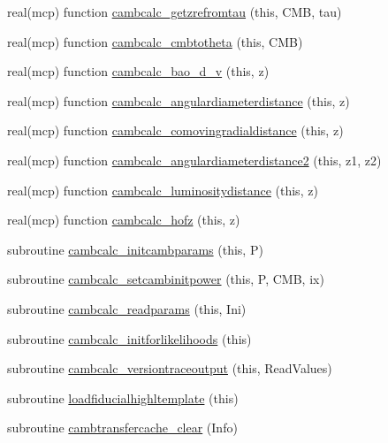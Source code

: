 \begin{DoxyCompactItemize}
real(mcp) function \mbox{\hyperlink{namespacecalculator__camb_a36d033f09a4d35c8b9a37d518fcebda0}{cambcalc\+\_\+getzrefromtau}} (this, C\+MB, tau)
\item 
real(mcp) function \mbox{\hyperlink{namespacecalculator__camb_a88bb5f71c4e4784315929d98702a1214}{cambcalc\+\_\+cmbtotheta}} (this, C\+MB)
\item 
real(mcp) function \mbox{\hyperlink{namespacecalculator__camb_a18709a68a49a6989073dae760f643430}{cambcalc\+\_\+bao\+\_\+d\+\_\+v}} (this, z)
\item 
real(mcp) function \mbox{\hyperlink{namespacecalculator__camb_a40bf5a8b3435b93efcaa688ecb4867f4}{cambcalc\+\_\+angulardiameterdistance}} (this, z)
\item 
real(mcp) function \mbox{\hyperlink{namespacecalculator__camb_a44d780a147bc9cea89b7ebe9a071b98a}{cambcalc\+\_\+comovingradialdistance}} (this, z)
\item 
real(mcp) function \mbox{\hyperlink{namespacecalculator__camb_a368f4f92f978124067f561deb5392714}{cambcalc\+\_\+angulardiameterdistance2}} (this, z1, z2)
\item 
real(mcp) function \mbox{\hyperlink{namespacecalculator__camb_a0f03309bd014f3de538a3565bc867402}{cambcalc\+\_\+luminositydistance}} (this, z)
\item 
real(mcp) function \mbox{\hyperlink{namespacecalculator__camb_a10e6be2c2d0ef7cb7741dbce3dbc88a9}{cambcalc\+\_\+hofz}} (this, z)
\item 
subroutine \mbox{\hyperlink{namespacecalculator__camb_a1f498feeb9fd7b4b6ff5c951bb3bcf5d}{cambcalc\+\_\+initcambparams}} (this, P)
\item 
subroutine \mbox{\hyperlink{namespacecalculator__camb_a30b5dc9bda2ffcd939436fbc93322f9e}{cambcalc\+\_\+setcambinitpower}} (this, P, C\+MB, ix)
\item 
subroutine \mbox{\hyperlink{namespacecalculator__camb_aa3a88e278563ca8092494c335094e325}{cambcalc\+\_\+readparams}} (this, Ini)
\item 
subroutine \mbox{\hyperlink{namespacecalculator__camb_a5eb19890ea9bf2acad52f23b9334e1e8}{cambcalc\+\_\+initforlikelihoods}} (this)
\item 
subroutine \mbox{\hyperlink{namespacecalculator__camb_a67d98d7cdaa015cca41f95ed94678a79}{cambcalc\+\_\+versiontraceoutput}} (this, Read\+Values)
\item 
subroutine \mbox{\hyperlink{namespacecalculator__camb_a8eeaa2b45303d1bb5c7323cbf4767ce7}{loadfiducialhighltemplate}} (this)
\item 
subroutine \mbox{\hyperlink{namespacecalculator__camb_a74de7ed91f31c5cccb3f6c738f689295}{cambtransfercache\+\_\+clear}} (Info)
\end{DoxyCompactItemize}


